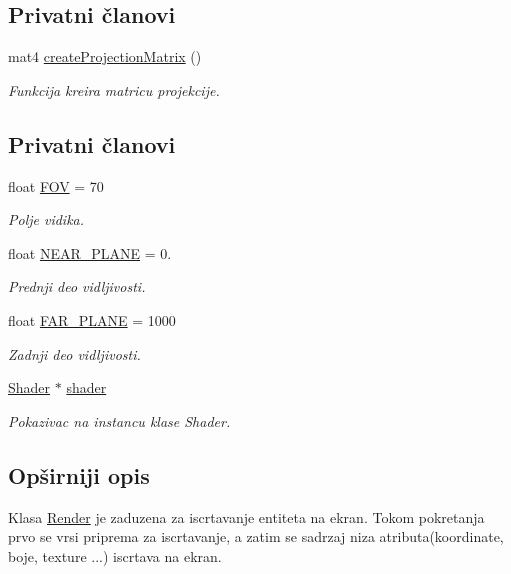 \subsection*{Privatni članovi}
\begin{DoxyCompactItemize}
\item 
mat4 \hyperlink{classcore_1_1Render_af0c1d960dc3ca1bab8abc1302d04c254}{create\+Projection\+Matrix} ()
\begin{DoxyCompactList}\small\item\em Funkcija kreira matricu projekcije. \end{DoxyCompactList}\end{DoxyCompactItemize}
\subsection*{Privatni članovi}
\begin{DoxyCompactItemize}
\item 
float \hyperlink{classcore_1_1Render_aab61f8ad63c67621572d45c3debfaff2}{F\+OV} = 70
\begin{DoxyCompactList}\small\item\em Polje vidika. \end{DoxyCompactList}\item 
float \hyperlink{classcore_1_1Render_a21b18ddc1ea04e877e9218e92cbb8a0a}{N\+E\+A\+R\+\_\+\+P\+L\+A\+NE} = 0.
\begin{DoxyCompactList}\small\item\em Prednji deo vidljivosti. \end{DoxyCompactList}\item 
float \hyperlink{classcore_1_1Render_a331f4b9d510f06bbbbf85f06ac8995a2}{F\+A\+R\+\_\+\+P\+L\+A\+NE} = 1000
\begin{DoxyCompactList}\small\item\em Zadnji deo vidljivosti. \end{DoxyCompactList}\item 
\hyperlink{classshader_1_1Shader}{Shader} $\ast$ \hyperlink{classcore_1_1Render_a220be4bb26b6cbec909953f247a7732c}{shader}
\begin{DoxyCompactList}\small\item\em Pokazivac na instancu klase Shader. \end{DoxyCompactList}\end{DoxyCompactItemize}


\subsection{Opširniji opis}
Klasa \hyperlink{classcore_1_1Render}{Render} je zaduzena za iscrtavanje entiteta na ekran. Tokom pokretanja prvo se vrsi priprema za iscrtavanje, a zatim se sadrzaj niza atributa(koordinate, boje, texture ...) iscrtava na ekran. 

